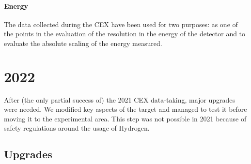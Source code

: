 \begin{refsection}
        \begin{figure}
            \centering
            \caption{}
            \label{fig:CEX:2021:energy}
        \end{figure}

        \paragraph{Energy} The data collected during the CEX have been used for two purposes: as one of the points in the evaluation of the resolution in the energy of the detector and to evaluate the absolute scaling of the energy measured.
        
\section{2022}
    After (the only partial success of) the 2021 CEX data-taking, major upgrades were needed.
    We modified key aspects of the target and managed to test it before moving it to the experimental area.
    This step was not possible in 2021 because of safety regulations around the usage of Hydrogen.

    \subsection{Upgrades}

\end{refsection}

